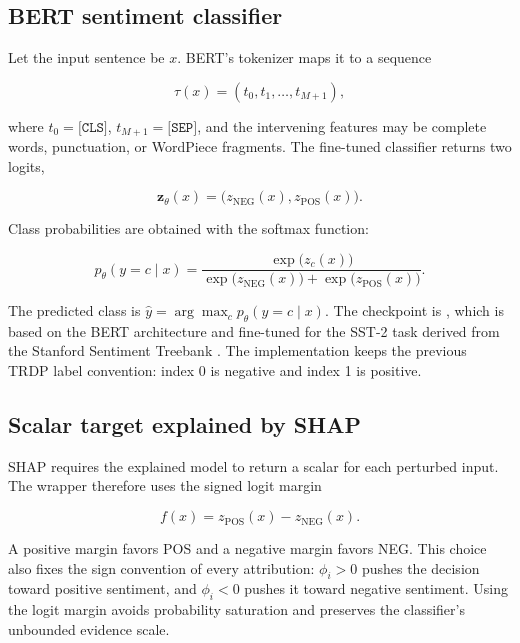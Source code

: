 \documentclass[11pt,a4paper]{article}
\begin{document}
\subsection{BERT sentiment classifier}

Let the input sentence be \(x\). BERT's tokenizer maps it to a sequence

\begin{equation}
  \tau(x) = (t_0,t_1,\ldots,t_{M+1}),
\end{equation}

where \(t_0=\texttt{[CLS]}\), \(t_{M+1}=\texttt{[SEP]}\), and the intervening
features may be complete words, punctuation, or WordPiece fragments. The
fine-tuned classifier returns two logits,

\begin{equation}
  \mathbf{z}_{\theta}(x)
  = \bigl(z_{\mathrm{NEG}}(x),z_{\mathrm{POS}}(x)\bigr).
\end{equation}

Class probabilities are obtained with the softmax function:

\begin{equation}
  p_{\theta}(y=c\mid x)
  = \frac{\exp\bigl(z_c(x)\bigr)}
         {\exp\bigl(z_{\mathrm{NEG}}(x)\bigr)
          +\exp\bigl(z_{\mathrm{POS}}(x)\bigr)}.
  \label{eq:softmax}
\end{equation}

The predicted class is \(\hat{y}=\arg\max_c p_{\theta}(y=c\mid x)\). The
checkpoint is , which is based on the
BERT architecture \cite{devlin2019} and fine-tuned for the SST-2 task derived
from the Stanford Sentiment Treebank \cite{socher2013}. The implementation keeps
the previous TRDP label convention: index 0 is negative and index 1 is positive.

\subsection{Scalar target explained by SHAP}

SHAP requires the explained model to return a scalar for each perturbed input.
The wrapper therefore uses the signed logit margin

\begin{equation}
  f(x)=z_{\mathrm{POS}}(x)-z_{\mathrm{NEG}}(x).
  \label{eq:margin}
\end{equation}

A positive margin favors POS and a negative margin favors NEG. This choice also
fixes the sign convention of every attribution: \(\phi_i>0\) pushes the decision
toward positive sentiment, and \(\phi_i<0\) pushes it toward negative sentiment.
Using the logit margin avoids probability saturation and preserves the classifier's
unbounded evidence scale.
\end{document}
